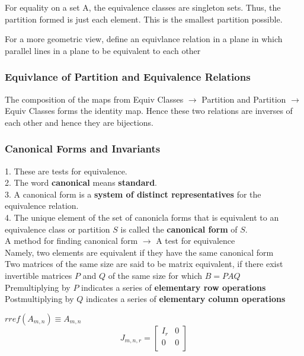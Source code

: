 \documentclass [12pt]{article}
\begin{document}
For equality on a set A, the equivalence classes are singleton sets. Thus,
the partition formed is just each element. This is the smallest partition
possible. 

For a more geometric view, define an equivlance relation in a plane in which
parallel lines in a plane to be equivalent to each other 


\subsubsection {Equivlance of Partition and Equivalence Relations} 

The composition of the maps from Equiv Classes $\rightarrow $ Partition
and Partition $\rightarrow $ Equiv Classes forms the identity map. Hence
these two relations are inverses of each other and hence they are bijections.


\subsubsection {Canonical Forms and Invariants} 

1. These are tests for equivalence.\\
2. The word \textbf{canonical} means \textbf{standard}.\\
3. A canonical form is a \textbf{system of distinct representatives} for
the equivalence relation.\\
4. The unique element of the set of canonicla forms that is equivalent to
an equivalence class or partition $S$ is called the \textbf{canonical form}
of $S$. \\

A method for finding canonical form $\rightarrow $ A test for equivalence\\
Namely, two elements are equivalent if they have the same canonical form\\

Two matrices of the same size are said to be matrix equivalent, if there
exist invertible matrices $P$ and $Q$ of the same size for which $B=PAQ$\\

Premultiplying by $P$ indicates a series of \textbf{elementary row operations}\\
Postmultiplying by $Q$ indicates a series of \textbf{elementary column operations}

$rref(A_{m,n})\equiv A_{m,n}$\\

\[J_{m,n,r}=
\begin {bmatrix}
I_r&0\\
0&0\\
%
\end {bmatrix}
 \]
 
\end{document}
